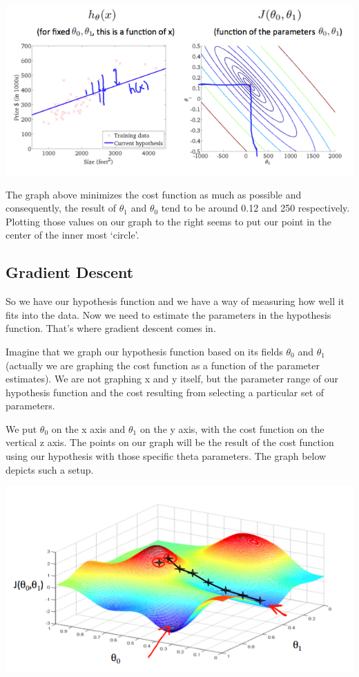 \documentclass[
]{article}
\begin{document}
\includegraphics{cost_function_intution2_graph3.png}

The graph above minimizes the cost function as much as possible and
consequently, the result of \(\theta_1\) and \(\theta_0\) tend to be
around 0.12 and 250 respectively. Plotting those values on our graph to
the right seems to put our point in the center of the inner most
`circle'.

\hypertarget{gradient-descent}{%
\subsection{Gradient Descent}\label{gradient-descent}}

So we have our hypothesis function and we have a way of measuring how
well it fits into the data. Now we need to estimate the parameters in
the hypothesis function. That's where gradient descent comes in.

Imagine that we graph our hypothesis function based on its fields
\(\theta_0\) and \(\theta_1\) (actually we are graphing the cost
function as a function of the parameter estimates). We are not graphing
x and y itself, but the parameter range of our hypothesis function and
the cost resulting from selecting a particular set of parameters.

We put \(\theta_0\) on the x axis and \(\theta_1\) on the y axis, with
the cost function on the vertical z axis. The points on our graph will
be the result of the cost function using our hypothesis with those
specific theta parameters. The graph below depicts such a setup.

\includegraphics{Gradient_descent_graph_1.png}
\end{document}
